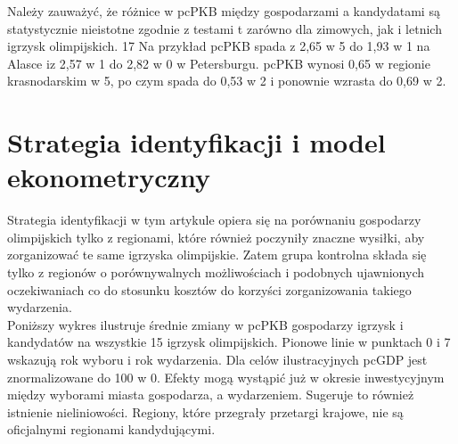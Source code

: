 \documentclass[12pt]{article}
\begin{document}
    Należy zauważyć, że różnice w pcPKB między gospodarzami a kandydatami są statystycznie nieistotne zgodnie z testami t zarówno dla zimowych, jak i letnich igrzysk olimpijskich. 17 Na przykład pcPKB spada z 2,65 w 5 do 1,93 w 1 na Alasce iz 2,57 w 1 do 2,82 w 0 w Petersburgu. pcPKB wynosi 0,65 w regionie krasnodarskim w 5, po czym spada do 0,53 w 2 i ponownie wzrasta do 0,69 w 2.\\

\newpage
\section{Strategia identyfikacji i model ekonometryczny}

Strategia identyfikacji w tym artykule opiera się na porównaniu gospodarzy olimpijskich tylko z regionami, które również poczyniły znaczne wysiłki, aby zorganizować te same igrzyska olimpijskie. Zatem grupa kontrolna składa się tylko z regionów o porównywalnych możliwościach i podobnych ujawnionych oczekiwaniach co do stosunku kosztów do korzyści zorganizowania takiego wydarzenia.\\

Poniższy wykres ilustruje średnie zmiany w pcPKB gospodarzy igrzysk i kandydatów na wszystkie 15 igrzysk olimpijskich. Pionowe linie w punktach 0 i 7 wskazują rok wyboru i rok wydarzenia. Dla celów ilustracyjnych pcGDP jest znormalizowane do 100 w 0. Efekty mogą wystąpić już w okresie inwestycyjnym między wyborami miasta gospodarza, a wydarzeniem. Sugeruje to również istnienie nieliniowości. Regiony, które przegrały przetargi krajowe, nie są oficjalnymi regionami kandydującymi. \\

\begin{center}
\end{center}
\end{document}
